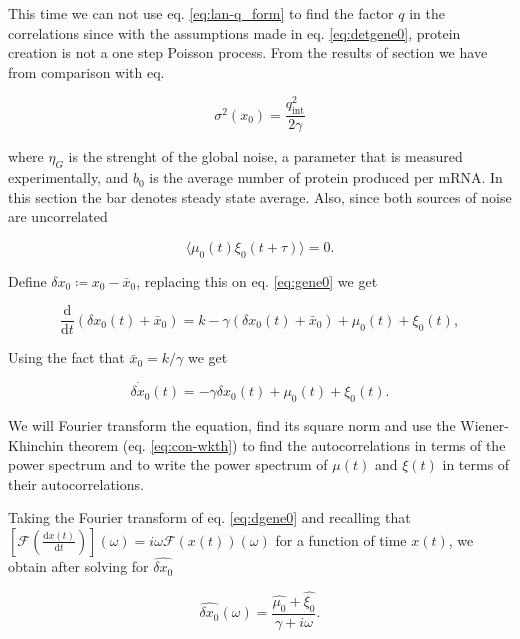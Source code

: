 This time we can not use eq. \eqref{eq:lan-q_form} to find the factor $q$ in the correlations since with the assumptions made in eq. \eqref{eq:detgene0}, protein creation is not a one step Poisson process. From the results of section \label{sec:lan-single} we have from comparison with eq. 

\begin{equation*}
  \sigma^2(x_0) = \frac{q_\text{int}^2}{2\gamma}
\end{equation*}


where $\eta_G$ is the strenght of the global noise, a parameter that is measured experimentally, and $b_0$ is the average number of protein produced per mRNA. In this section the bar denotes steady state average. Also, since both sources of noise are uncorrelated

\begin{equation}
\label{eq:corinex0}
\langle\mu_0(t)\xi_0(t+\tau)\rangle = 0.
\end{equation}

Define $\delta x_0 \coloneqq x_0 - \bar{x}_0$, replacing this on eq. \eqref{eq:gene0} we get

\begin{equation}
\frac{\mathrm{d}}{\mathrm{d}t}\left(\delta x_0(t) + \bar{x}_0\right) = k - \gamma (\delta x_0(t) + \bar{x}_0) + \mu_0(t) + \xi_0(t),
\end{equation}

Using the fact that $\bar{x}_0=k/\gamma$ we get

\begin{equation}
\label{eq:dgene0}
\dot{\delta x_0}(t) = -\gamma \delta x_0(t) + \mu_0(t) + \xi_0(t).
\end{equation}

We will Fourier transform the equation, find its square norm and use the Wiener-Khinchin theorem (eq. \eqref{eq:con-wkth}) to find the autocorrelations in terms of the power spectrum and to write the power spectrum of $\mu(t)$ and $\xi(t)$ in terms of their autocorrelations.

Taking the Fourier transform of eq. \eqref{eq:dgene0} and recalling that $[\mathscr{F}(\frac{\mathrm{d}x(t)}{\mathrm{d}t})](\omega) = i\omega \mathscr{F}(x(t))(\omega)$ for a function of time $x(t)$, we obtain after solving for $\hat{\delta x_0}$

\begin{equation}
\label{eq:fgene0}
\hat{\delta x_0}(\omega) = \frac{\hat{\mu_0}+\hat{\xi_0}}{\gamma + i\omega}.
\end{equation}

